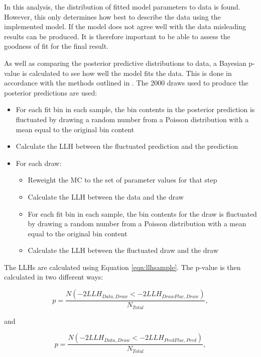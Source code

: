 In this analysis, the distribution of fitted model parameters to data is found. However, this only determines how best to describe the data using the implemented model. If the model does not agree well with the data misleading results can be produced. It is therefore important to be able to assess the goodness of fit for the final result.

As well as comparing the posterior predictive distributions to data, a Bayesian p-value is calculated to see how well the model fits the data. This is done in accordance with the methods outlined in \cite{Gelman_Example,Gelman_Post,Gelman_Understanding}.  The 2000 draws used to produce the posterior predictions are used:

\begin{itemize}
	\item For each fit bin in each sample, the bin contents in the posterior prediction is fluctuated by drawing a random number from a Poisson distribution with a mean equal to the original bin content
	\item Calculate the LLH between the fluctuated prediction and the prediction
   \item For each draw:
   \begin{itemize}
   \item Reweight the MC to the set of parameter values for that step
   \item Calculate the LLH between the data and the draw
   \item For each fit bin in each sample, the bin contents for the draw is fluctuated by drawing a random number from a Poisson distribution with a mean equal to the original bin content
  \item Calculate the LLH between the fluctuated draw and the draw
  \end{itemize}
\end{itemize}

The LLHs are calculated using Equation \ref{eqn:llhsample}. The p-value is then calculated in two different ways:

\begin{equation}
p = \frac{N(-2LLH_{Data, Draw} < -2LLH_{Draw Fluc, Draw})}{N_{Total}},
\end{equation}

and

\begin{equation}
p = \frac{N(-2LLH_{Data, Draw} < -2LLH_{Pred Fluc, Pred})}{N_{Total}},
\end{equation}

